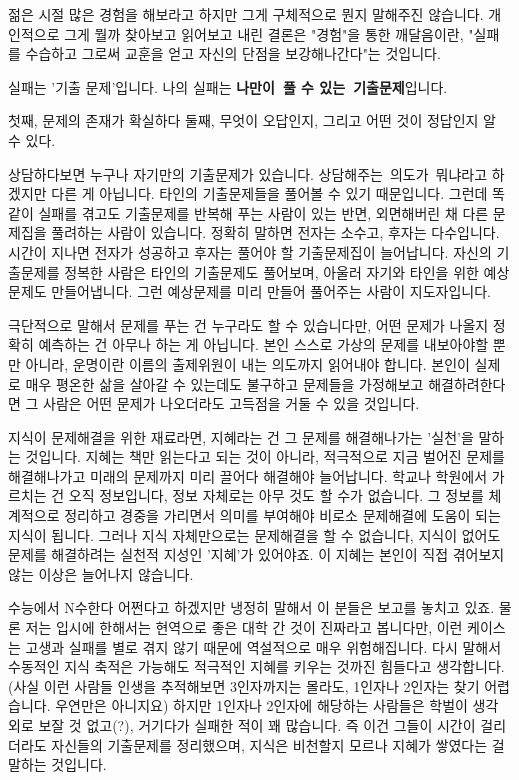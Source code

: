 젊은 시절 많은 경험을 해보라고 하지만 그게 구체적으로 뭔지 말해주진 않습니다.
개인적으로 그게 뭘까 찾아보고 읽어보고 내린 결론은
"경험"을 통한 깨달음이란, "실패를 수습하고 그로써 교훈을 얻고 자신의 단점을 보강해나간다"는 것입니다.
\vspace{5mm}

실패는 '기출 문제'입니다.
나의 실패는 \textbf{나만이 풀 수 있는 기출문제}입니다.
\vspace{5mm}

첫째, 문제의 존재가 확실하다
둘째, 무엇이 오답인지, 그리고 어떤 것이 정답인지 알 수 있다.
\vspace{5mm}

상담하다보면 누구나 자기만의 기출문제가 있습니다.
상담해주는 의도가 뭐냐라고 하겠지만 다른 게 아닙니다. 타인의 기출문제들을 풀어볼 수 있기 때문입니다.
그런데 똑같이 실패를 겪고도 기출문제를 반복해 푸는 사람이 있는 반면, 외면해버린 채 다른 문제집을 풀려하는 사람이 있습니다.
정확히 말하면 전자는 소수고, 후자는 다수입니다. 시간이 지나면 전자가 성공하고 후자는 풀어야 할 기출문제집이 늘어납니다.
자신의 기출문제를 정복한 사람은 타인의 기출문제도 풀어보며, 아울러 자기와 타인을 위한 예상문제도 만들어냅니다.
그런 예상문제를 미리 만들어 풀어주는 사람이 지도자입니다.
\vspace{5mm}

극단적으로 말해서 문제를 푸는 건 누구라도 할 수 있습니다만, 어떤 문제가 나올지 정확히 예측하는 건 아무나 하는 게 아닙니다.
본인 스스로 가상의 문제를 내보아야할 뿐만 아니라, 운명이란 이름의 출제위원이 내는 의도까지 읽어내야 합니다.
본인이 실제로 매우 평온한 삶을 살아갈 수 있는데도 불구하고 문제들을 가정해보고 해결하려한다면
그 사람은 어떤 문제가 나오더라도 고득점을 거둘 수 있을 것입니다.
\vspace{5mm}

지식이 문제해결을 위한 재료라면, 지혜라는 건 그 문제를 해결해나가는 '실천'을 말하는 것입니다.
지혜는 책만 읽는다고 되는 것이 아니라, 적극적으로 지금 벌어진 문제를 해결해나가고 미래의 문제까지 미리 끌어다 해결해야 늘어납니다.
학교나 학원에서 가르치는 건 오직 정보입니다, 정보 자체로는 아무 것도 할 수가 없습니다.
그 정보를 체계적으로 정리하고 경중을 가리면서 의미를 부여해야 비로소 문제해결에 도움이 되는 지식이 됩니다.
그러나 지식 자체만으로는 문제해결을 할 수 없습니다, 지식이 없어도 문제를 해결하려는 실천적 지성인 '지혜'가 있어야죠.
이 지혜는 본인이 직접 겪어보지 않는 이상은 늘어나지 않습니다.
\vspace{5mm}

수능에서 N수한다 어쩐다고 하겠지만 냉정히 말해서 이 분들은 보고를 놓치고 있죠.
물론 저는 입시에 한해서는 현역으로 좋은 대학 간 것이 진짜라고 봅니다만, 이런 케이스는 고생과 실패를 별로 겪지 않기 때문에
역설적으로 매우 위험해집니다. 다시 말해서 수동적인 지식 축적은 가능해도 적극적인 지혜를 키우는 것까진 힘들다고 생각합니다.
(사실 이런 사람들 인생을 추적해보면 3인자까지는 몰라도, 1인자나 2인자는 찾기 어렵습니다. 우연만은 아니지요)
하지만 1인자나 2인자에 해당하는 사람들은 학벌이 생각 외로 보잘 것 없고(?), 거기다가 실패한 적이 꽤 많습니다.
즉 이건 그들이 시간이 걸리더라도 자신들의 기출문제를 정리했으며, 지식은 비천할지 모르나 지혜가 쌓였다는 걸 말하는 것입니다.
\vspace{5mm}

